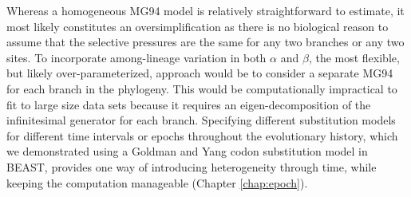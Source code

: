 Whereas a homogeneous MG94 model is relatively straightforward to estimate, it most likely constitutes an oversimplification as there is no biological reason to assume that the selective pressures are the same for any two branches or any two sites.
To incorporate among-lineage variation in both $\alpha$ and $\beta$, the most flexible, but likely over-parameterized, approach would be to consider a separate MG94 for each branch in the phylogeny.
This would be
computationally impractical to fit to large size data sets because it requires an eigen-decomposition of the infinitesimal generator for each branch.
Specifying different substitution models for different time intervals or epochs throughout the evolutionary history, which we demonstrated using a Goldman and Yang codon substitution model \cite{goldman94} in BEAST, provides one way of introducing heterogeneity through time, while keeping the computation manageable (Chapter \ref{chap:epoch}). 

